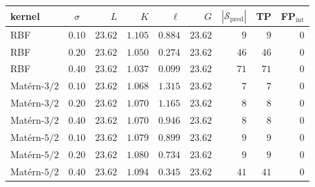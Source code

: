 \small
\setlength{\tabcolsep}{5pt}
\begin{tabular}{lcrrrrrrr}
\toprule
kernel          & $\sigma$ & $L$     & $K$     & $\ell$  & $G$     & $|\mathcal{S}_{\mathrm{pred}}|$ & TP & FP$_{\mathrm{int}}$ \\
\midrule
RBF             & $0.10$   & $23.62$ & $1.105$ & $0.884$ & $23.62$ & $ 9$ & $ 9$ & $0$ \\
RBF             & $0.20$   & $23.62$ & $1.050$ & $0.274$ & $23.62$ & $46$ & $46$ & $0$ \\
RBF             & $0.40$   & $23.62$ & $1.037$ & $0.099$ & $23.62$ & $71$ & $71$ & $0$ \\
Mat\'ern-$3/2$  & $0.10$   & $23.62$ & $1.068$ & $1.315$ & $23.62$ & $ 7$ & $ 7$ & $0$ \\
Mat\'ern-$3/2$  & $0.20$   & $23.62$ & $1.070$ & $1.165$ & $23.62$ & $ 8$ & $ 8$ & $0$ \\
Mat\'ern-$3/2$  & $0.40$   & $23.62$ & $1.070$ & $0.946$ & $23.62$ & $ 8$ & $ 8$ & $0$ \\
Mat\'ern-$5/2$  & $0.10$   & $23.62$ & $1.079$ & $0.899$ & $23.62$ & $ 9$ & $ 9$ & $0$ \\
Mat\'ern-$5/2$  & $0.20$   & $23.62$ & $1.080$ & $0.734$ & $23.62$ & $ 9$ & $ 9$ & $0$ \\
Mat\'ern-$5/2$  & $0.40$   & $23.62$ & $1.094$ & $0.345$ & $23.62$ & $41$ & $41$ & $0$ \\
\bottomrule
\end{tabular}
